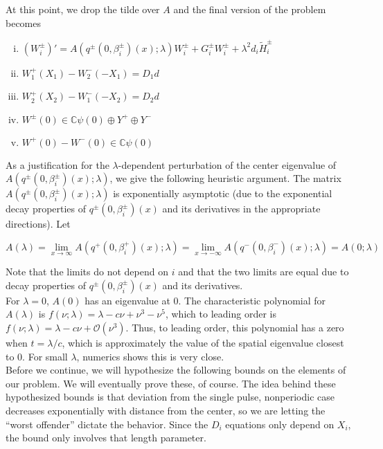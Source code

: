 \documentclass[12pt]{article}
\def\C{{\mathbb C}}
\begin{document}
At this point, we drop the tilde over $A$ and the final version of the problem becomes

\begin{enumerate}[(i)]
\item $(W_i^\pm)' = A(q^\pm(0, \beta_i^\pm)(x); \lambda) W_i^\pm + G_i^\pm W_i^\pm + \lambda^2 d_i \tilde{H}_i^\pm$
\item $W_1^+(X_1) - W_2^-(-X_1) = D_1 d$
\item $W_2^+(X_2) - W_1^-(-X_2) = D_2 d$
\item $W^\pm(0) \in \C \psi(0) \oplus Y^+ \oplus Y^-$
\item $W^+(0) - W^-(0) \in \C \psi(0) $
\end{enumerate}

As a justification for the $\lambda$-dependent perturbation of the center eigenvalue of $A(q^\pm(0, \beta_i^\pm)(x); \lambda)$, we give the following heuristic argument. The matrix $A(q^\pm(0, \beta_i^\pm)(x); \lambda)$ is exponentially asymptotic (due to the exponential decay properties of $q^\pm(0, \beta_i^\pm)(x)$ and its derivatives in the appropriate directions). Let 

\[
A(\lambda) = \lim_{x \rightarrow \infty} A(q^+(0, \beta_i^+)(x); \lambda) 
= \lim_{x \rightarrow -\infty} A(q^-(0, \beta_i^-)(x); \lambda) = A(0; \lambda)
\]

Note that the limits do not depend on $i$ and that the two limits are equal due to decay properties of $q^\pm(0, \beta_i^\pm)(x)$ and its derivatives.\\

For $\lambda = 0$, $A(0)$ has an eigenvalue at 0. The characteristic polynomial for $A(\lambda)$ is $f(\nu; \lambda) = \lambda - c \nu + \nu^3 - \nu^5$, which to leading order is $f(\nu; \lambda) = \lambda - c \nu + \mathcal{O}(\nu^3)$. Thus, to leading order, this polynomial has a zero when $t = \lambda / c$, which is approximately the value of the spatial eigenvalue closest to 0. For small $\lambda$, numerics shows this is very close.\\

Before we continue, we will hypothesize the following bounds on the elements of our problem. We will eventually prove these, of course. The idea behind these hypothesized bounds is that deviation from the single pulse, nonperiodic case decreases exponentially with distance from the center, so we are letting the ``worst offender'' dictate the behavior. Since the $D_i$ equations only depend on $X_i$, the bound only involves that length parameter.
\end{document}
